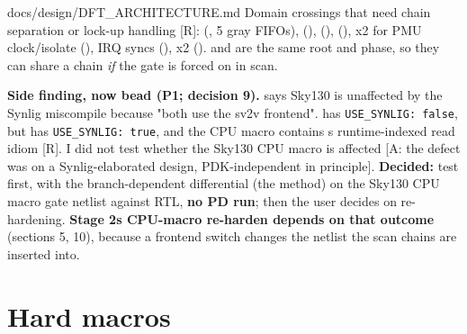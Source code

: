 \begin{relocated}{docs/design/DFT_ARCHITECTURE.md}
Domain crossings that need chain separation or lock-up handling {[}R{]}:
 (, 5 gray FIFOs),
 (), 
(),  (),  x2
for PMU clock/\allowbreak{}isolate (), IRQ syncs
(),  x2 ().
 and  are the same root and phase,
so they can share a chain \emph{if} the gate is forced on in scan.

\textbf{Side finding, now bead  (P1; decision 9).}
 says Sky130 is unaffected by the  Synlig
miscompile because "both use the sv2v frontend".
 has
\texttt{USE\_\allowbreak{}SYNLIG:\allowbreak{}\ false}, but
 has
\texttt{USE\_\allowbreak{}SYNLIG:\allowbreak{}\ true}, and the CPU macro
contains \textquotesingle s runtime-indexed read
idiom {[}R{]}. I did not test whether the Sky130 CPU macro is affected
{[}A: the defect was  on a Synlig-elaborated design,
PDK-independent in principle{]}. \textbf{Decided:} test first, with the
 branch-dependent differential (the
 method) on the Sky130 CPU macro gate netlist
against RTL, \textbf{no PD run}; then the user decides on re-hardening.
\textbf{Stage 2\textquotesingle s CPU-macro re-harden depends on that
outcome} (sections 5, 10), because a frontend switch changes the netlist
the scan chains are inserted into.

\section{Hard macros}\label{tm:ch:dft-architecture:5-hard-macros}


\end{relocated}
